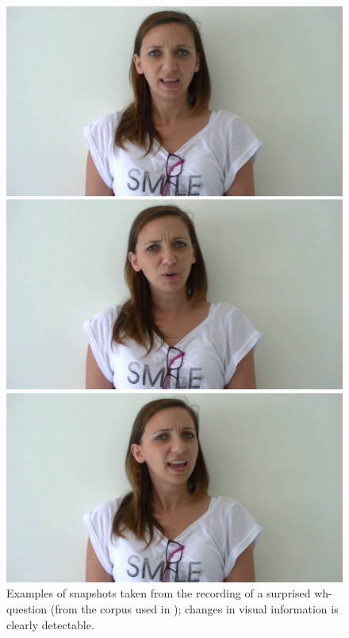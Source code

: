 \documentclass[output=paper]{langsci/langscibook}
\begin{document}
  

\begin{figure}
\includegraphics[height=.3\textheight]{figures/GIL-img2.png}

\includegraphics[height=.3\textheight]{figures/GIL-img3.png}

\includegraphics[height=.3\textheight]{figures/GIL-img4.png}
\caption{Examples of snapshots taken from the recording of a surprised wh-question (from the corpus used in \citealt{GiliFivela2015informazionimultimodali}); changes in visual information is clearly detectable.}
\label{fig:gil:2}
\end{figure} 
\end{document}

